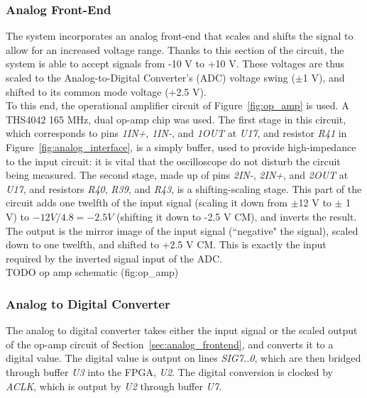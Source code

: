 \documentclass{scrartcl}
\begin{document}
	\subsubsection{Analog Front-End \label{sec:analog_frontend}}
	The system incorporates an analog front-end that scales and shifts the signal to allow for an increased voltage range. Thanks to this section of the circuit, the system is able to accept signals from -10 V to +10 V. These voltages are thus scaled to the Analog-to-Digital Converter's (ADC) voltage swing ($\pm$1 V), and shifted to its common mode voltage (+2.5 V).\\

	To this end, the operational amplifier circuit of Figure~\ref{fig:op_amp} is used. A THS4042 165 MHz, dual op-amp chip was used. The first stage in this circuit, which corresponds to pins \textit{1IN+}, \textit{1IN-}, and \textit{1OUT} at \textit{U17}, and resistor \textit{R41} in Figure~\ref{fig:analog_interface}, is a simply buffer, used to provide high-impedance to the input circuit: it is vital that the oscilloscope do not disturb the circuit being measured. The second stage, made up of pins \textit{2IN-}, \textit{2IN+}, and \textit{2OUT} at \textit{U17}, and resistors \textit{R40}, \textit{R39}, and \textit{R43}, is a shifting-scaling stage. This part of the circuit adds one twelfth of the input signal (scaling it down from $\pm$12 V to $\pm$ 1 V) to $-12 V / 4.8 = -2.5 V$ (shifting it down to -2.5 V CM), and inverts the result. The output is the mirror image of the input signal (``negative" the signal), scaled down to one twelfth, and shifted to +2.5 V CM. This is exactly the input required by the inverted signal input of the ADC.\\

	TODO op amp schematic (fig:op_amp)

	\subsubsection{Analog to Digital Converter \label{sec:analog_adc}}
	The analog to digital converter takes either the input signal or the scaled output of the op-amp circuit of Section~\ref{sec:analog_frontend}, and converts it to a digital value. The digital value is output on lines \textit{SIG7..0}, which are then bridged through buffer \textit{U3} into the FPGA, \textit{U2}. The digital conversion is clocked by \textit{ACLK}, which is output by \textit{U2} through buffer \textit{U7}.\\
\end{document}
